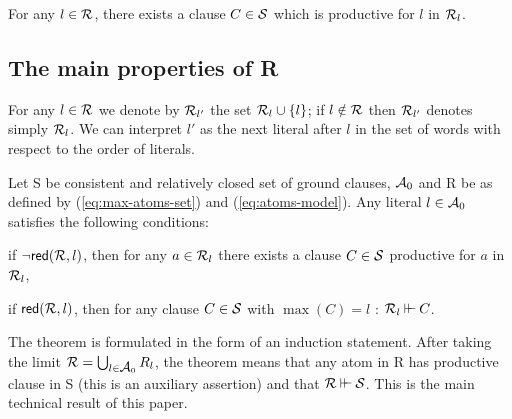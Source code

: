 \begin{LEMMA} \label{le:productive-clause}
For any $l\in\mbox{$\cal R$}$, there exists a clause \(C\in\mbox{$\cal S$}\)
which is productive for $l$ in \(\mbox{$\cal R$}_l\).
\end{LEMMA}

\subsection{The main properties of \protect\C R} \label{se:main-R}
For any \(l\in\mbox{$\cal R$}\) we denote by \(\mbox{$\cal R$}_{l'}\) the set \(\mbox{$\cal R$}_l\cup\{l\}\);
if \(l\notin\mbox{$\cal R$}\) then $\mbox{$\cal R$}_{l'}$ denotes simply \(\mbox{$\cal R$}_l\).
We can interpret \(l'\)
as the next literal after \(l\) in the set of words with respect to the order 
of literals.

\begin{THEOREM} \label{le:main-theorem}
Let \C S be consistent and relatively closed set of ground clauses, \(\mbox{$\cal A$}_0\) 
and \C R be as defined by (\ref {eq:max-atoms-set}) and (\ref {eq:atoms-model}).
Any literal \(l\in \mbox{$\cal A$}_0\) satisfies the following conditions:
\begin{description}\MyLPar
\item[I1.] if \(\neg\mbox{\sf red}({\cal R},l)\), then for any \(a\in\mbox{$\cal R$}_l\) there
  exists a clause $C\in \mbox{$\cal S$}$ productive for $a$ in \(\mbox{$\cal R$}_l\),
\item[I2.] if \(\mbox{\sf red}(\mbox{$\cal R$},l)\), then for any clause   
  \(C\in \mbox{$\cal S$}\) with \(\max(C)=l\) : $\mathrel{\mbox{$\cal R$}_l \mathbin{\vdash\!\!\vdash} C}$.
\end{description}
\end{THEOREM}
The theorem is formulated in the form of an induction statement. 
After taking the
limit \(\mbox{$\cal R$}=\bigcup_{l\in\mbox{$\cal A$}_0} R_l\), the theorem
means that any atom in \C R has productive clause in \C S
(this is an auxiliary assertion) and that \(\mathrel{\mbox{$\cal R$} \mathbin{\vdash\!\!\vdash} \mbox{$\cal S$}}\).
This is the main technical result of this paper.


